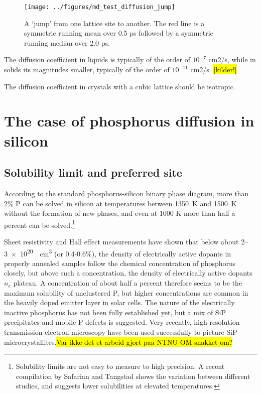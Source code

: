 \documentclass[11pt,bibliography=totoc,index=totoc]{scrbook}   %
\newcommand{\comment}[1]{\hl{#1}}
\begin{document}
\begin{figure}[htbp]
  \begin{center}
    \texttt{[image: ../figures/md\_test\_diffusion\_jump]}
  \end{center}
  \caption{A `jump' from one lattice site to another. The red line is a symmetric running mean over 0.5 ps followed by a symmetric running median over 2.0 ps.}
  \label{fig:../figures/md_test_diffusion_jump}
\end{figure}

The diffusion coefficient in liquids is typically of the order of $10^{-7}$ cm2/s,
while in solids its magnitudes smaller, typically of the order of $10^{-11}$ cm2/s. \comment{[kilder!]}


The diffusion coefficient in crystals with a cubic lattice should be isotropic.

%
\section{The case of phosphorus diffusion in silicon}\label{sec:P}
%

%
\subsection{Solubility limit and preferred site}\label{sec:PSolubility}
%

According to the standard phosphorus-silicon binary phase diagram,\cite{PSiPhaseDiagram} more than 2\% P can be solved in silicon at temperatures between \SI{1350}{\kelvin} and \SI{1500}{\kelvin} without the formation of new phases, and even at 1000 K more than half a percent can be solved.\footnote{Solubility limits are not easy to measure to high precision. A recent compilation by Safarian and Tangstad shows the variation between different studies, and suggests lower solubilities at elevated temperatures.\cite{Safarian:2011}}

Sheet resistivity and Hall effect measurements have shown that below about 2–\SI{3e20}{\per\centi\metre\cubed} (or 0.4-0.6\%), the density of electrically active dopants in properly annealed samples follow the chemical concentration of phosphorus closely, but above such a concentration, the density of electrically active dopants $n_e$ plateau.\cite{Tannenbaum:1961}
A concentration of about half a percent therefore seems to be the maximum solubility of unclustered P,\cite{Solmi:1998} but higher concentrations
are common in the heavily doped emitter layer in solar cells.\cite{Bentzen:2006b}
The nature of the electrically inactive phosphorus has not been fully established yet, but a mix of SiP precipitates and mobile P defects is suggested.\cite{Armigliato:1976}\cite{Solmi:1996} 
Very recently, high resolution transmission electron microscopy have been used successfully to picture SiP microcrystallites.\comment{Var ikke det et arbeid gjort paa NTNU OM snakket om?}
\end{document}
